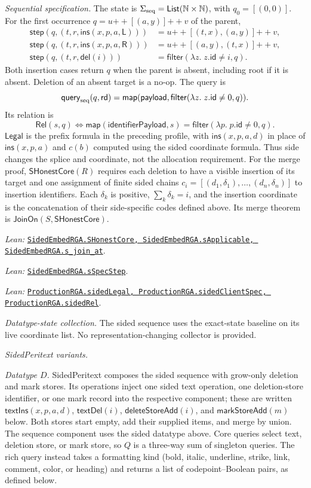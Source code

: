 \documentclass[11pt]{article}
\theoremstyle{definition}
\newcommand{\N}{\mathbb N}
\newcommand{\src}[2]{\href{../../#1}{\texttt{#2}}}
\newcommand{\anchor}[2]{\par\smallskip\noindent\emph{Lean: }\src{#1}{#2}.}
\begin{document}
\emph{Sequential specification.} The state is
$\Sigma_{\rm seq}=\mathsf{List}(\N\times\N)$, with $q_0=[(0,0)]$.
For the first occurrence $q=u{+\!+}[(a,y)]{+\!+}v$ of the parent,
\[
\begin{aligned}
 \mathsf{step}(q,(t,r,\mathsf{ins}(x,p,a,\mathsf{L})))
   &=u{+\!+}[(t,x),(a,y)]{+\!+}v,\\
 \mathsf{step}(q,(t,r,\mathsf{ins}(x,p,a,\mathsf{R})))
   &=u{+\!+}[(a,y),(t,x)]{+\!+}v,\\
 \mathsf{step}(q,(t,r,\mathsf{del}(i)))
   &=\mathsf{filter}(\lambda z.\;z.\mathsf{id}\ne i,q).
\end{aligned}
\]
Both insertion cases return $q$ when the parent is absent, including root
if it is absent. Deletion of an absent target is a no-op. The query is
\[
 \mathsf{query}_{\rm seq}(q,\mathsf{rd})=
 \mathsf{map}(\mathsf{payload},
   \mathsf{filter}(\lambda z.\;z.\mathsf{id}\ne0,q)).
\]
Its relation is
\[
 \mathsf{Rel}(s,q)\Longleftrightarrow
 \mathsf{map}(\mathsf{identifierPayload},s)
   =\mathsf{filter}(\lambda p.\;p.\mathsf{id}\ne0,q).
\]
$\mathsf{Legal}$ is the prefix formula in the preceding profile, with
$\mathsf{ins}(x,p,a,d)$ in place of $\mathsf{ins}(x,p,a)$ and $c(b)$
computed using the sided coordinate formula. Thus side changes the splice
and coordinate, not the allocation requirement.
For the merge proof, $\mathsf{SHonestCore}(R)$ requires each deletion to have
a visible insertion of its target and one assignment of finite sided chains
$c_i=[(d_1,\delta_1),\ldots,(d_n,\delta_n)]$ to insertion identifiers.
Each $\delta_k$ is positive, $\sum_k\delta_k=i$, and the insertion coordinate
is the concatenation of their side-specific codes defined above.
Its merge theorem is
$\mathsf{JoinOn}(S,\mathsf{SHonestCore})$.
\anchor{Sal/MRDTs/Instances/SidedEmbedRGA.lean}
  {SidedEmbedRGA.SHonestCore, SidedEmbedRGA.sApplicable,
   SidedEmbedRGA.s\_join\_at}
\anchor{Sal/MRDTs/Instances/SidedEmbedRGASequential.lean}
  {SidedEmbedRGA.sSpecStep}
\anchor{Sal/MRDTs/Instances/ProductionRGA.lean}
  {ProductionRGA.sidedLegal, ProductionRGA.sidedClientSpec, ProductionRGA.sidedRel}



\emph{Datatype-state collection.} The sided sequence uses the exact-state baseline on its live coordinate list. No representation-changing collector is provided.

\emph{SidedPeritext variants.}

\emph{Datatype $D$.} SidedPeritext composes the sided sequence with grow-only deletion and mark
stores. Its operations inject one sided text operation, one deletion-store
identifier, or one mark record into the respective component; these are
written $\mathsf{textIns}(x,p,a,d)$, $\mathsf{textDel}(i)$,
$\mathsf{deleteStoreAdd}(i)$, and $\mathsf{markStoreAdd}(m)$ below.
Both stores start empty, add their supplied items, and merge by union.
The sequence component uses the sided datatype above. Core queries select
text, deletion store, or mark store, so $Q$ is a three-way sum of singleton
queries. The rich query instead takes a formatting kind (bold, italic,
underline, strike, link, comment, color, or heading) and returns a list of
codepoint--Boolean pairs, as defined below.
\end{document}
